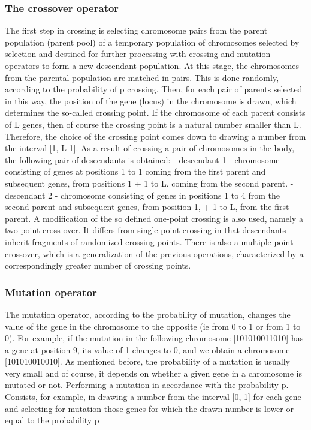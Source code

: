 \subsubsection{The crossover operator}
The first step in crossing is selecting chromosome pairs from the parent population 
(parent pool) of a temporary population of chromosomes selected by selection and 
destined for further processing with crossing and mutation operators to form a new 
descendant population. At this stage, the chromosomes from the parental population 
are matched in pairs. This is done randomly, according to the probability of p 
crossing. 
Then, for each pair of parents selected in this way, the position of the gene 
(locus) in the chromosome is drawn, which determines the so-called crossing point. 
If the chromosome of each parent consists of L genes, then of course the crossing point 
is a natural number smaller than L. 
Therefore, the choice of the crossing point comes down to drawing a number from the 
interval [1, L-1]. 
As a result of crossing a pair of chromosomes in the body, the following pair 
of descendants is obtained: - descendant 1 - chromosome consisting of genes at 
positions 1 to 1 coming from the first parent and subsequent genes, from positions 
1 + 1 to L. coming from the second parent. - descendant 2 - chromosome consisting of 
genes in positions 1 to 4 from the second parent and subsequent genes, from position 
1, + 1 to L, from the first parent. 
A modification of the so defined one-point crossing is also used, namely a two-point 
cross over. It differs from single-point crossing in that descendants inherit fragments
of randomized crossing points. There is also a multiple-point crossover, which is a 
generalization of the previous operations, characterized by a correspondingly greater 
number of crossing points.

\subsubsection{Mutation operator}
The mutation operator, according to the probability of mutation, changes the value 
of the gene in the chromosome to the opposite (ie from 0 to 1 or from 1 to 0). 
For example, if the mutation in the following chromosome [101010011010] has a 
gene at position 9, its value of 1 changes to 0, and we obtain a chromosome 
[101010010010]. 
As mentioned before, the probability of a mutation is usually very small and 
of course, it depends on whether a given gene in a chromosome is mutated or not. 
Performing a mutation in accordance with the probability p. 
Consists, for example, in drawing a number from the interval [0, 1] 
for each gene and selecting for mutation those genes for which the drawn number 
is lower or equal to the probability p

